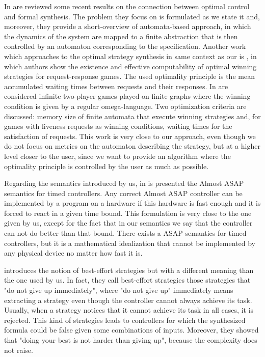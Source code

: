 In \cite{CS19} are reviewed some recent results on the connection between optimal control and formal synthesis. The problem they focus on is formulated as we state it and, moreover, they provide a short-overview of automata-based approach, in which the dynamics of the system are mapped to a finite abstraction that is then controlled by an automaton corresponding to the specification.
Another work which approaches to the optimal strategy synthesis in same context as our is \cite{HWWZ14}, in which authors show the existence and effective computability of optimal winning strategies for request-response games. The used optimality principle is the mean accumulated waiting times between requests and their responses.
In \cite{W08} are considered infinite two-player games played on finite graphs where the winning condition is given by a regular omega-language. Two optimization criteria are discussed: memory size of finite automata that execute winning strategies and, for games with liveness requests as winning conditions, waiting times for the satisfaction of requests.
This work is very close to our approach, even though we do not focus on metrics on the automaton describing the strategy, but at a higher level closer to the user, since we want to provide an algorithm where the optimality principle is controlled by the user as much as possible.



Regarding the semantics introduced by us, in \cite{MLJ2004} is presented the Almost ASAP semantics for timed controllers. Any correct Almost ASAP controller can be implemented by a program on a hardware if this hardware is fast enough and it is forced to react in a given time bound.
This formulation is very close to the one given by us, except for the fact that in our semantics we say that the controller can not do better than that bound.
There exists a ASAP semantics for timed controllers, but it is a mathematical idealization that cannot be implemented by any physical device no matter how fast it is.

\cite{BGS2021} introduces the notion of best-effort strategies but with a different meaning than the one used by us.
In fact, they call best-effort strategies those strategies that "do not give up immediately", where "do not give up" immediately means extracting a strategy even though the controller cannot always achieve its task.
Usually, when a strategy notices that it cannot achieve its task in all cases, it is rejected.
This kind of strategies leads to controllers for which the synthesized formula could be false given some combinations of inputs.
Moreover, they showed that "doing your best is not harder than giving up", because the complexity does not raise.

